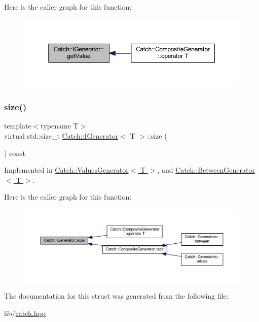 Here is the caller graph for this function\+:\nopagebreak
\begin{figure}[H]
\begin{center}
\leavevmode
\includegraphics[width=350pt]{struct_catch_1_1_i_generator_ad69e937cb66dba3ed9429c42abf4fce3_icgraph}
\end{center}
\end{figure}
\hypertarget{struct_catch_1_1_i_generator_a2e317253b03e838b6065ce69719a198e}{}\label{struct_catch_1_1_i_generator_a2e317253b03e838b6065ce69719a198e} 
\subsubsection{\texorpdfstring{size()}{size()}}
{\footnotesize\ttfamily template$<$typename T$>$ \\
virtual std\+::size\+\_\+t \hyperlink{struct_catch_1_1_i_generator}{Catch\+::\+I\+Generator}$<$ T $>$\+::size (\begin{DoxyParamCaption}{ }\end{DoxyParamCaption}) const\hspace{0.3cm}{\ttfamily [pure virtual]}}



Implemented in \hyperlink{class_catch_1_1_values_generator_a9aa5b140ee502975cf35115e534ab771}{Catch\+::\+Values\+Generator$<$ T $>$}, and \hyperlink{class_catch_1_1_between_generator_af65a1fe51f9b1106fc676e3dd189adb6}{Catch\+::\+Between\+Generator$<$ T $>$}.

Here is the caller graph for this function\+:\nopagebreak
\begin{figure}[H]
\begin{center}
\leavevmode
\includegraphics[width=350pt]{struct_catch_1_1_i_generator_a2e317253b03e838b6065ce69719a198e_icgraph}
\end{center}
\end{figure}


The documentation for this struct was generated from the following file\+:\begin{DoxyCompactItemize}
\item 
lib/\hyperlink{catch_8hpp}{catch.\+hpp}\end{DoxyCompactItemize}
